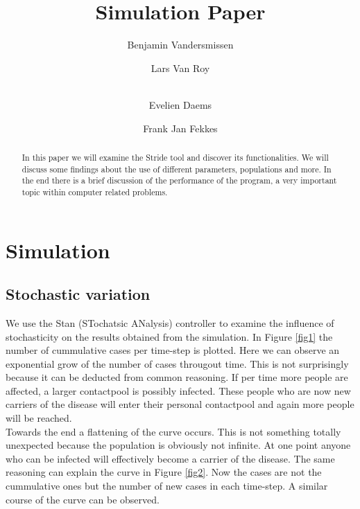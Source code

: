 \documentclass[runningheads]{llncs}
\begin{document}
%
\title{Simulation Paper}

\author{Benjamin Vandersmissen \and
Lars Van Roy \and \\
Evelien Daems \and
Frank Jan Fekkes}
%
%
%
\maketitle              %
%
\begin{abstract}
In this paper we will examine the Stride tool and discover its functionalities.
We will discuss some findings about the use of different parameters, populations and more.
In the end there is a brief discussion of the performance of the program, a very important topic within computer related problems.

\end{abstract}

\section{Simulation}

\subsection{Stochastic variation}
We use the Stan (STochatsic ANalysis) controller to examine the influence of stochasticity on the results obtained from the simulation. \newline
In Figure \ref{fig1} the number of cummulative cases per time-step is plotted. Here we can observe an exponential grow of the number of cases througout time. This is not surprisingly because it can be deducted from common reasoning. If per time more people are affected, a larger contactpool is possibly infected. These people who are now new carriers of the disease will enter their personal contactpool and again more people will be reached.\\
Towards the end a flattening of the curve occurs. This is not something totally unexpected because the population is obviously not infinite. At one point anyone who can be infected will effectively become a carrier of the disease. \newline
The same reasoning can explain the curve in Figure \ref{fig2}. Now the cases are not the cummulative ones but the number of new cases in each time-step. A similar course of the curve can be observed.
\end{document}
